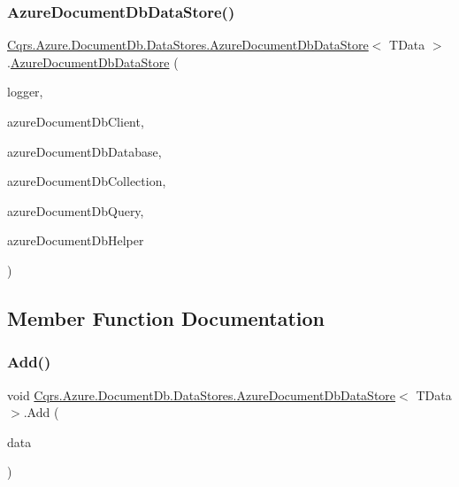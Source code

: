 \subsubsection{\texorpdfstring{Azure\+Document\+Db\+Data\+Store()}{AzureDocumentDbDataStore()}}
{\footnotesize\ttfamily \hyperlink{classCqrs_1_1Azure_1_1DocumentDb_1_1DataStores_1_1AzureDocumentDbDataStore}{Cqrs.\+Azure.\+Document\+Db.\+Data\+Stores.\+Azure\+Document\+Db\+Data\+Store}$<$ T\+Data $>$.\hyperlink{classCqrs_1_1Azure_1_1DocumentDb_1_1DataStores_1_1AzureDocumentDbDataStore}{Azure\+Document\+Db\+Data\+Store} (\begin{DoxyParamCaption}\item[{I\+Logger}]{logger,  }\item[{Document\+Client}]{azure\+Document\+Db\+Client,  }\item[{Database}]{azure\+Document\+Db\+Database,  }\item[{Document\+Collection}]{azure\+Document\+Db\+Collection,  }\item[{I\+Ordered\+Queryable$<$ T\+Data $>$}]{azure\+Document\+Db\+Query,  }\item[{\hyperlink{interfaceCqrs_1_1Azure_1_1DocumentDb_1_1IAzureDocumentDbHelper}{I\+Azure\+Document\+Db\+Helper}}]{azure\+Document\+Db\+Helper }\end{DoxyParamCaption})}



\subsection{Member Function Documentation}
\mbox{\label{classCqrs_1_1Azure_1_1DocumentDb_1_1DataStores_1_1AzureDocumentDbDataStore_ad17e6e846430e617af24be48b77d1528_ad17e6e846430e617af24be48b77d1528}} 
\subsubsection{\texorpdfstring{Add()}{Add()}\hspace{0.1cm}{\footnotesize\ttfamily [1/2]}}
{\footnotesize\ttfamily void \hyperlink{classCqrs_1_1Azure_1_1DocumentDb_1_1DataStores_1_1AzureDocumentDbDataStore}{Cqrs.\+Azure.\+Document\+Db.\+Data\+Stores.\+Azure\+Document\+Db\+Data\+Store}$<$ T\+Data $>$.Add (\begin{DoxyParamCaption}\item[{T\+Data}]{data }\end{DoxyParamCaption})}



